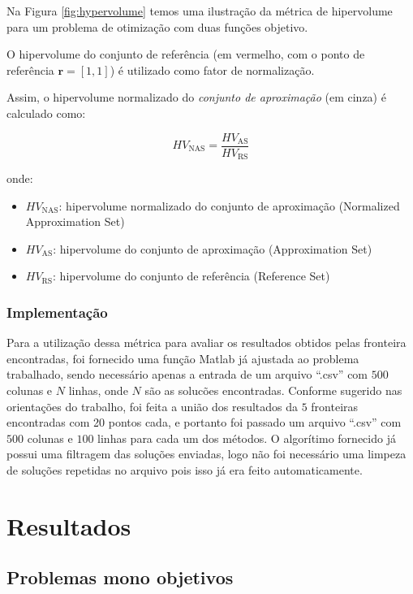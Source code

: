 \documentclass[conference]{IEEEtran}
\begin{document}
Na Figura \ref{fig:hypervolume} temos uma ilustração da métrica de hipervolume para um problema de otimização com duas funções objetivo.

O hipervolume do conjunto de referência (em vermelho, com o ponto de referência \( \mathbf{r} = [1, 1] \)) é utilizado como fator de normalização.

Assim, o hipervolume normalizado do \textit{conjunto de aproximação} (em cinza) é calculado como:

\[
HV_{\text{NAS}} = \frac{HV_{\text{AS}}}{HV_{\text{RS}}}
\]

onde:
\begin{itemize}
    \item \( HV_{\text{NAS}} \): hipervolume normalizado do conjunto de aproximação (Normalized Approximation Set)
    \item \( HV_{\text{AS}} \): hipervolume do conjunto de aproximação (Approximation Set)
    \item \( HV_{\text{RS}} \): hipervolume do conjunto de referência (Reference Set)
\end{itemize}

\subsubsection{Implementação}

Para a utilização dessa métrica para avaliar os resultados obtidos pelas fronteira encontradas, foi fornecido uma função Matlab já ajustada ao problema trabalhado,
sendo necessário apenas a entrada de um arquivo ``.csv'' com $500$ colunas e $N$ linhas, onde $N$ são as solucões encontradas. Conforme sugerido nas orientações do trabalho,
foi feita a união dos resultados da $5$ fronteiras encontradas com 20 pontos cada, e portanto foi passado um arquivo ``.csv'' com $500$ colunas e $100$ linhas para cada um dos
métodos.
O algorítimo fornecido já possui uma filtragem das soluções enviadas, logo não foi necessário uma limpeza de soluções repetidas no arquivo pois isso já era feito automaticamente.



\section{Resultados}

\subsection{Problemas mono objetivos}
\end{document}
